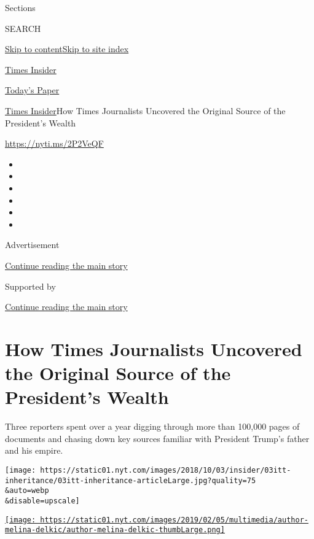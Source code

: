 Sections

SEARCH

\protect\hyperlink{site-content}{Skip to
content}\protect\hyperlink{site-index}{Skip to site index}

\href{https://www.nytimes.com/section/reader-center}{Times Insider}

\href{https://myaccount.nytimes.com/auth/login?response_type=cookie\&client_id=vi}{}

\href{https://www.nytimes.com/section/todayspaper}{Today's Paper}

\href{/section/reader-center}{Times Insider}\textbar{}How Times
Journalists Uncovered the Original Source of the President's Wealth

\url{https://nyti.ms/2P2VeQF}

\begin{itemize}
\item
\item
\item
\item
\item
\item
\end{itemize}

Advertisement

\protect\hyperlink{after-top}{Continue reading the main story}

Supported by

\protect\hyperlink{after-sponsor}{Continue reading the main story}

\hypertarget{how-times-journalists-uncovered-the-original-source-of-the-presidents-wealth}{%
\section{How Times Journalists Uncovered the Original Source of the
President's
Wealth}\label{how-times-journalists-uncovered-the-original-source-of-the-presidents-wealth}}

Three reporters spent over a year digging through more than 100,000
pages of documents and chasing down key sources familiar with President
Trump's father and his empire.

\texttt{[image: https://static01.nyt.com/images/2018/10/03/insider/03itt-inheritance/03itt-inheritance-articleLarge.jpg?quality=75\\\&auto=webp\\\&disable=upscale]}

\href{https://www.nytimes.com/by/melina-delkic}{\texttt{[image: https://static01.nyt.com/images/2019/02/05/multimedia/author-melina-delkic/author-melina-delkic-thumbLarge.png]}}

